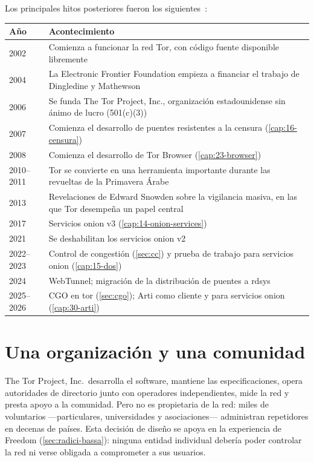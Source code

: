 Los principales hitos posteriores fueron los siguientes~\cite{torhistory}:
\begin{center}\small
\begin{tabularx}{\textwidth}{@{}l>{\raggedright\arraybackslash}X@{}}
\toprule
Año & Acontecimiento \\
\midrule
2002 & Comienza a funcionar la red Tor, con código fuente disponible libremente \\
2004 & La Electronic Frontier Foundation empieza a financiar el trabajo de Dingledine y Mathewson \\
2006 & Se funda The Tor Project, Inc., organización estadounidense sin ánimo de lucro (501(c)(3)) \\
2007 & Comienza el desarrollo de puentes resistentes a la censura (\cref{cap:16-censura}) \\
2008 & Comienza el desarrollo de Tor Browser (\cref{cap:23-browser}) \\
2010--2011 & Tor se convierte en una herramienta importante durante las revueltas de la Primavera Árabe \\
2013 & Revelaciones de Edward Snowden sobre la vigilancia masiva, en las que Tor desempeña un papel central \\
2017 & Servicios onion v3 (\cref{cap:14-onion-services}) \\
2021 & Se deshabilitan los servicios onion v2 \\
2022--2023 & Control de congestión (\cref{sec:cc}) y prueba de trabajo para servicios onion (\cref{cap:15-dos}) \\
2024 & WebTunnel; migración de la distribución de puentes a rdsys \\
2025--2026 & CGO en tor (\cref{sec:cgo}); Arti como cliente y para servicios onion (\cref{cap:30-arti}) \\
\bottomrule
\end{tabularx}
\end{center}

\section{Una organización y una comunidad}\label{sec:nascita-comunita}

The Tor Project, Inc.\ desarrolla el software, mantiene las especificaciones, opera autoridades de directorio junto con operadores independientes, mide la red y presta apoyo a la comunidad. Pero no es propietaria de la red: miles de voluntarios ---particulares, universidades y asociaciones--- administran repetidores en decenas de países. Esta decisión de diseño se apoya en la experiencia de Freedom (\cref{sec:radici-bassa}): ninguna entidad individual debería poder controlar la red ni verse obligada a comprometer a sus usuarios.

